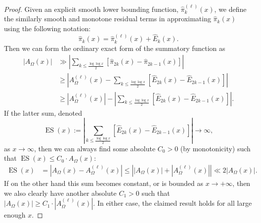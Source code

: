 \documentclass[11pt,reqno,a4letter]{article}
\numberwithin{figure}{section}
\numberwithin{table}{section}
\theoremstyle{plain}
\numberwithin{theorem}{section}
\theoremstyle{definition}
\begin{document}
\begin{proof} 
Given an explicit smooth lower bounding function, $\widehat{\pi}_k^{(\ell)}(x)$, we define the 
similarly smooth and monotone residual terms in approximating $\widehat{\pi}_k(x)$ 
using the following notation: 
\[
\widehat{\pi}_k(x) = \widehat{\pi}_k^{(\ell)}(x) + \widehat{E}_k(x). 
\]
Then we can form the ordinary exact form of the summatory function as 
\begin{align*} 
|A_{\Omega}(x)| & \gg \left\lvert \sum_{k \leq \frac{\log\log x}{2}} 
     \left[\widehat{\pi}_{2k}(x) - \widehat{\pi}_{2k-1}(x)\right] \right\rvert \\ 
     & \geq \left\lvert A_{\Omega}^{(\ell)}(x) - \sum_{k \leq \frac{\log\log x}{2}} 
     \left[\widehat{E}_{2k}(x) - \widehat{E}_{2k-1}(x)\right] 
     \right\rvert \\ 
     & \geq 
     \left\lvert A_{\Omega}^{(\ell)}(x) \right\rvert - 
     \left\lvert \sum_{k \leq \frac{\log\log x}{2}} 
     \left[\widehat{E}_{2k}(x) - \widehat{E}_{2k-1}(x)\right]
     \right\rvert. 
\end{align*} 
If the latter sum, denoted 
$$\operatorname{ES}(x) := \left\lvert \sum_{k \leq \frac{\log\log x}{2}} 
   \left[\widehat{E}_{2k}(x) - \widehat{E}_{2k-1}(x)\right] \right\rvert \rightarrow \infty,$$ as 
$x \rightarrow \infty$, then we can always find some absolute $C_0 > 0$ (by monotonicity) such that 
$\operatorname{ES}(x) \leq C_0 \cdot A_{\Omega}(x)$: 
\begin{align*} 
\operatorname{ES}(x) & = \left\lvert A_{\Omega}(x) - A_{\Omega}^{(\ell)}(x) \right\rvert 
     \leq \left\lvert |A_{\Omega}(x)| + 
     \left\lvert A_{\Omega}^{(\ell)}(x) \right\rvert \right\rvert 
     \ll 2 \left\lvert A_{\Omega}(x) \right\rvert. 
\end{align*} 
If on the other hand this sum becomes constant, or is bounded 
as $x \rightarrow +\infty$, then we also clearly have another absolute $C_1 > 0$ such that 
$|A_{\Omega}(x)| \geq C_1 \cdot |A_{\Omega}^{(\ell)}(x)|$. 
In either case, the claimed result holds for all large enough $x$. 
\end{proof} 
\end{document}
